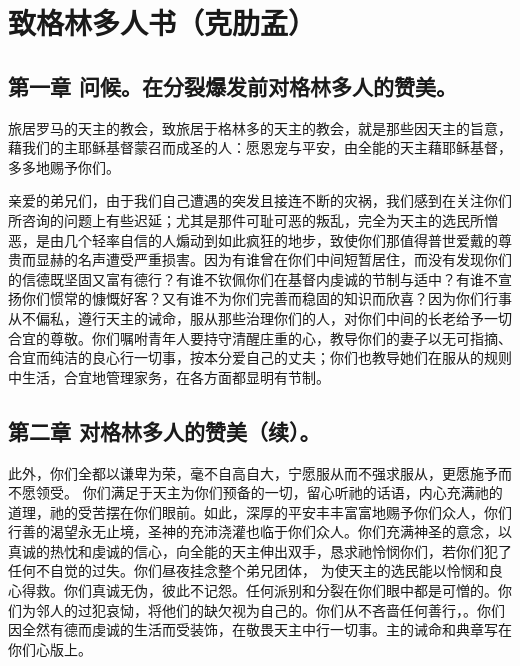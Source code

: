
\chapter{致格林多人书（克肋孟）}



\section{第一章 问候。在分裂爆发前对格林多人的赞美。}

旅居罗马的天主的教会，致旅居于格林多的天主的教会，就是那些因天主的旨意，藉我们的主耶稣基督蒙召而成圣的人：愿恩宠与平安，由全能的天主藉耶稣基督，多多地赐予你们。\par

亲爱的弟兄们，由于我们自己遭遇的突发且接连不断的灾祸，我们感到在关注你们所咨询的问题上有些迟延；尤其是那件可耻可恶的叛乱，完全为天主的选民所憎恶，是由几个轻率自信的人煽动到如此疯狂的地步，致使你们那值得普世爱戴的尊贵而显赫的名声遭受严重损害。因为有谁曾在你们中间短暂居住，而没有发现你们的信德既坚固又富有德行？有谁不钦佩你们在基督内虔诚的节制与适中？有谁不宣扬你们惯常的慷慨好客？又有谁不为你们完善而稳固的知识而欣喜？因为你们行事从不偏私，遵行天主的诫命，服从那些治理你们的人，对你们中间的长老给予一切合宜的尊敬。你们嘱咐青年人要持守清醒庄重的心，教导你们的妻子以无可指摘、合宜而纯洁的良心行一切事，按本分爱自己的丈夫；你们也教导她们在服从的规则中生活，合宜地管理家务，在各方面都显明有节制。\par


\section{第二章 对格林多人的赞美（续）。}

此外，你们全都以谦卑为荣，毫不自高自大，宁愿服从而不强求服从，更愿施予而不愿领受。 你们满足于天主为你们预备的一切，留心听祂的话语，内心充满祂的道理，祂的受苦摆在你们眼前。如此，深厚的平安丰丰富富地赐予你们众人，你们行善的渴望永无止境，圣神的充沛浇灌也临于你们众人。你们充满神圣的意念，以真诚的热忱和虔诚的信心，向全能的天主伸出双手，恳求祂怜悯你们，若你们犯了任何不自觉的过失。你们昼夜挂念整个弟兄团体， 为使天主的选民能以怜悯和良心得救。你们真诚无伪，彼此不记怨。任何派别和分裂在你们眼中都是可憎的。你们为邻人的过犯哀恸，将他们的缺欠视为自己的。你们从不吝啬任何善行，。你们因全然有德而虔诚的生活而受装饰，在敬畏天主中行一切事。主的诫命和典章写在你们心版上。\par

